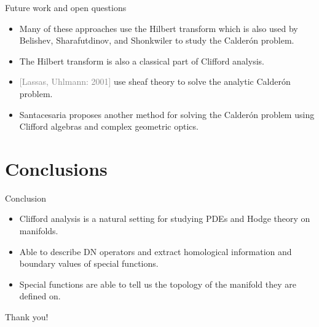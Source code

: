 \documentclass[aspectratio=169,handout]{beamer}
\newcommand\grey[1]{\textcolor{gray}{#1}}
\begin{document}
\begin{frame}{Future work and open questions}
\vfill
\begin{itemize}
  \item Many of these approaches use the Hilbert transform which is also used by Belishev, Sharafutdinov, and Shonkwiler to study the Calder\'on problem.
  \item The Hilbert transform is also a classical part of Clifford analysis.
  \item \grey{[Lassas, Uhlmann: 2001]} use sheaf theory to solve the analytic Calder\'on problem.
  \item Santacesaria proposes another method for solving the Calder\'on problem using Clifford algebras and complex geometric optics.
\end{itemize}
\vfill
\end{frame}

\section{Conclusions}

\begin{frame}{Conclusion}
\vfill
\begin{itemize}
\pause
    \item Clifford analysis is a natural setting for studying PDEs and Hodge theory on manifolds.
\pause
    \item Able to describe DN operators and extract homological information and boundary values of special functions.
\pause
    \item Special functions are able to tell us the topology of the manifold they are defined on.
\end{itemize}
\vfill
\end{frame}


\begin{frame}{}
\vfill
\begin{center}
\large Thank you!
\end{center}
\vfill
\end{frame}
\end{document}
